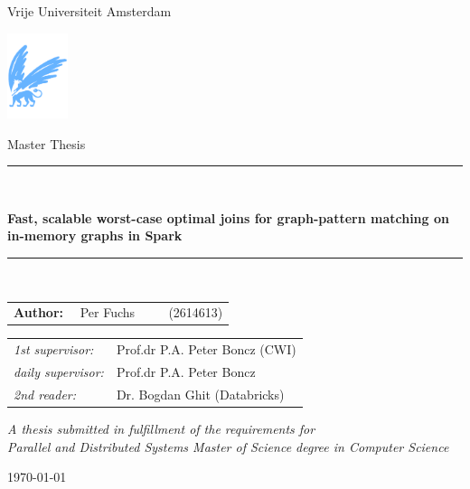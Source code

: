 \documentclass[11pt]{article}
\title{
}
\author{}
\date{}
\begin{document}
  \thispagestyle{empty}

  \begin{center}

    Vrije Universiteit Amsterdam

    \vspace{1mm}

    \includegraphics[height=25mm]{figures/vu-griffioen.pdf}

    \vspace{1cm}

    {\Large Master Thesis}

    \vspace*{1.5cm}

    \rule{.9\linewidth}{.6pt}\\[0.4cm]
    {\Large \bfseries Fast, scalable worst-case optimal joins for graph-pattern matching on in-memory graphs in Spark\par}\vspace{0.4cm}
    \rule{.9\linewidth}{.6pt}\\[1.5cm]

    \vspace*{2mm}

    {\Large
    \begin{tabular}{l}
    {\bf Author:} ~~Per Fuchs ~~~~ (2614613)
    \end{tabular}
    }

    \vspace*{2cm}

    \begin{tabular}{ll}
    {\it 1st supervisor:}   & Prof.dr P.A. Peter Boncz (CWI) \\
    {\it daily supervisor:} & Prof.dr P.A. Peter Boncz  \\
    {\it 2nd reader:}       & Dr. Bogdan Ghit (Databricks)
    \end{tabular}

    \vspace*{2.5cm}

    \textit{A thesis submitted in fulfillment of the requirements for\\ Parallel and Distributed Systems Master of Science degree in
    Computer Science}


    \today %

  \end{center}
  \newpage
\maketitle
\end{document}
